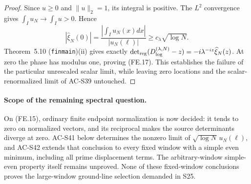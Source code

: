\begin{proof}
Since \(u\geq0\) and \(\|u\|_2=1\), its integral is positive.
The \(L^2\) convergence gives
\(\int_Iu_N\to\int_Iu>0\).  Hence
\[
 |\widehat\xi_N(0)|
   =\frac{|\int_Iu_N(x)dx|}{|u_N(\ell)|}
                              \geq c_\lambda\sqrt{\log N}.
\]
Theorem~5.10 (\texttt{finmain})(ii) gives exactly
\(\det_{\rm reg}(D^{(\lambda,N)}_{\log}-z)
 =-i\lambda^{-iz}\widehat\xi_N(z)\).
At zero the phase has modulus one, proving (FE.17).
This establishes the failure of the particular unrescaled scalar
limit, while leaving zero locations and the scalar-renormalized
limit of AC-S39 untouched.
\end{proof}

\paragraph{Scope of the remaining spectral question.}
On (FE.15), ordinary finite endpoint normalization is now decided:
it tends to zero on normalized vectors, and its reciprocal makes
the source determinants diverge at zero.
AC-S41 below determines the nonzero limit of
\(\sqrt{\log N}\,u_N(\ell)\), and AC-S42 extends that conclusion
to every fixed window with a simple even minimum, including all
prime displacement terms.  The arbitrary-window simple-even
property itself remains unproved.  None of these fixed-window conclusions
proves the large-window ground-line selection demanded in S25.
